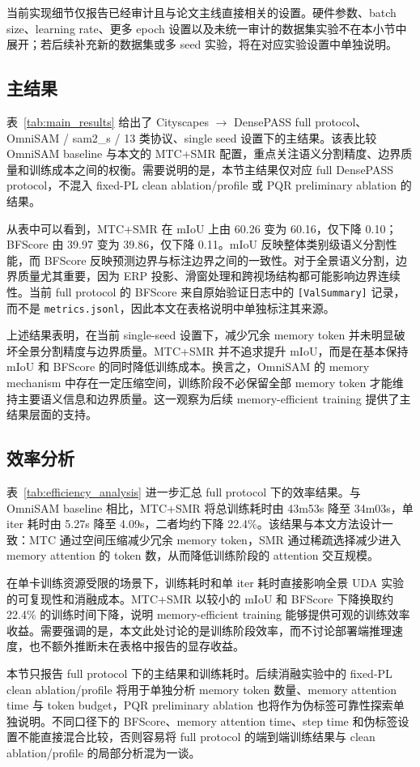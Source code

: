 当前实现细节仅报告已经审计且与论文主线直接相关的设置。硬件参数、batch size、learning rate、更多 epoch 设置以及未统一审计的数据集实验不在本小节中展开；若后续补充新的数据集或多 seed 实验，将在对应实验设置中单独说明。


\subsection{主结果}


表~\ref{tab:main_results} 给出了 Cityscapes $\rightarrow$ DensePASS full protocol、OmniSAM / sam2\_s / 13 类协议、single seed 设置下的主结果。该表比较 OmniSAM baseline 与本文的 MTC+SMR 配置，重点关注语义分割精度、边界质量和训练成本之间的权衡。需要说明的是，本节主结果仅对应 full DensePASS protocol，不混入 fixed-PL clean ablation/profile 或 PQR preliminary ablation 的结果。

从表中可以看到，MTC+SMR 在 mIoU 上由 60.26 变为 60.16，仅下降 0.10；BFScore 由 39.97 变为 39.86，仅下降 0.11。mIoU 反映整体类别级语义分割性能，而 BFScore 反映预测边界与标注边界之间的一致性。对于全景语义分割，边界质量尤其重要，因为 ERP 投影、滑窗处理和跨视场结构都可能影响边界连续性。当前 full protocol 的 BFScore 来自原始验证日志中的 \texttt{[ValSummary]} 记录，而不是 \texttt{metrics.jsonl}，因此本文在表格说明中单独标注其来源。

上述结果表明，在当前 single-seed 设置下，减少冗余 memory token 并未明显破坏全景分割精度与边界质量。MTC+SMR 并不追求提升 mIoU，而是在基本保持 mIoU 和 BFScore 的同时降低训练成本。换言之，OmniSAM 的 memory mechanism 中存在一定压缩空间，训练阶段不必保留全部 memory token 才能维持主要语义信息和边界质量。这一观察为后续 memory-efficient training 提供了主结果层面的支持。

\subsection{效率分析}


表~\ref{tab:efficiency_analysis} 进一步汇总 full protocol 下的效率结果。与 OmniSAM baseline 相比，MTC+SMR 将总训练耗时由 43m53s 降至 34m03s，单 iter 耗时由 5.27s 降至 4.09s，二者均约下降 22.4\%。该结果与本文方法设计一致：MTC 通过空间压缩减少冗余 memory token，SMR 通过稀疏选择减少进入 memory attention 的 token 数，从而降低训练阶段的 attention 交互规模。

在单卡训练资源受限的场景下，训练耗时和单 iter 耗时直接影响全景 UDA 实验的可复现性和消融成本。MTC+SMR 以较小的 mIoU 和 BFScore 下降换取约 22.4\% 的训练时间下降，说明 memory-efficient training 能够提供可观的训练效率收益。需要强调的是，本文此处讨论的是训练阶段效率，而不讨论部署端推理速度，也不额外推断未在表格中报告的显存收益。

本节只报告 full protocol 下的主结果和训练耗时。后续消融实验中的 fixed-PL clean ablation/profile 将用于单独分析 memory token 数量、memory attention time 与 token budget，PQR preliminary ablation 也将作为伪标签可靠性探索单独说明。不同口径下的 BFScore、memory attention time、step time 和伪标签设置不能直接混合比较，否则容易将 full protocol 的端到端训练结果与 clean ablation/profile 的局部分析混为一谈。
